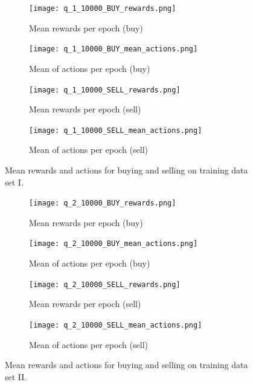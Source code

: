 \begin{figure}
    \centering
    \begin{subfigure}[b]{0.4\textwidth}
        \texttt{[image: q\_1\_10000\_BUY\_rewards.png]}
        \caption{Mean rewards per epoch (buy)}
        \label{fig:analysis-q-learn-1-reward-buy}
    \end{subfigure}
    \begin{subfigure}[b]{0.4\textwidth}
        \texttt{[image: q\_1\_10000\_BUY\_mean\_actions.png]}
        \caption{Mean of actions per epoch (buy)}
        \label{fig:analysis-q-learn-1-action-buy}
    \end{subfigure}
    \begin{subfigure}[b]{0.4\textwidth}
        \texttt{[image: q\_1\_10000\_SELL\_rewards.png]}
        \caption{Mean rewards per epoch (sell)}
        \label{fig:analysis-q-learn-1-reward-sell}
    \end{subfigure}
    \begin{subfigure}[b]{0.4\textwidth}
        \texttt{[image: q\_1\_10000\_SELL\_mean\_actions.png]}
        \caption{Mean of actions per epoch (sell)}
        \label{fig:analysis-q-learn-1-action-sell}
    \end{subfigure}
    \caption{Mean rewards and actions for buying and selling on training data set I.}
    \label{fig:analysis-q-learn-1}
\end{figure}
\begin{figure}
    \centering
    \begin{subfigure}[b]{0.4\textwidth}
        \texttt{[image: q\_2\_10000\_BUY\_rewards.png]}
        \caption{Mean rewards per epoch (buy)}
        \label{fig:analysis-q-learn-2-reward-buy}
    \end{subfigure}
    \begin{subfigure}[b]{0.4\textwidth}
        \texttt{[image: q\_2\_10000\_BUY\_mean\_actions.png]}
        \caption{Mean of actions per epoch (buy)}
        \label{fig:analysis-q-learn-2-action-buy}
    \end{subfigure}
    \begin{subfigure}[b]{0.4\textwidth}
        \texttt{[image: q\_2\_10000\_SELL\_rewards.png]}
        \caption{Mean rewards per epoch (sell)}
        \label{fig:analysis-q-learn-2-reward-sell}
    \end{subfigure}
    \begin{subfigure}[b]{0.4\textwidth}
        \texttt{[image: q\_2\_10000\_SELL\_mean\_actions.png]}
        \caption{Mean of actions per epoch (sell)}
        \label{fig:analysis-q-learn-2-action-sell}
    \end{subfigure}
    \caption{Mean rewards and actions for buying and selling on training data set II.}
    \label{fig:analysis-q-learn-2}
\end{figure}

